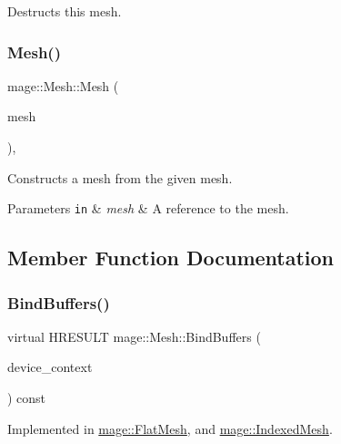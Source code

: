 Destructs this mesh. \hypertarget{classmage_1_1_mesh_a1627e85c72d10bdedbfbf746b108cc73}{}\label{classmage_1_1_mesh_a1627e85c72d10bdedbfbf746b108cc73} 
\subsubsection{\texorpdfstring{Mesh()}{Mesh()}\hspace{0.1cm}{\footnotesize\ttfamily [2/2]}}
{\footnotesize\ttfamily mage\+::\+Mesh\+::\+Mesh (\begin{DoxyParamCaption}\item[{const \hyperlink{classmage_1_1_mesh}{Mesh} \&}]{mesh }\end{DoxyParamCaption})\hspace{0.3cm}{\ttfamily [private]}, {\ttfamily [delete]}}

Constructs a mesh from the given mesh.


\begin{DoxyParams}[1]{Parameters}
\mbox{\tt in}  & {\em mesh} & A reference to the mesh. \\
\hline
\end{DoxyParams}


\subsection{Member Function Documentation}
\hypertarget{classmage_1_1_mesh_a0e558e82b0db25b0bbb4abeba9f0fb0f}{}\label{classmage_1_1_mesh_a0e558e82b0db25b0bbb4abeba9f0fb0f} 
\subsubsection{\texorpdfstring{Bind\+Buffers()}{BindBuffers()}}
{\footnotesize\ttfamily virtual H\+R\+E\+S\+U\+LT mage\+::\+Mesh\+::\+Bind\+Buffers (\begin{DoxyParamCaption}\item[{\hyperlink{namespacemage_ae74f374780900893caa5555d1031fd79}{Com\+Ptr}$<$ I\+D3\+D11\+Device\+Context2 $>$}]{device\+\_\+context }\end{DoxyParamCaption}) const\hspace{0.3cm}{\ttfamily [pure virtual]}}



Implemented in \hyperlink{classmage_1_1_flat_mesh_a3d7a8793a2b802aa51ae91517201af6d}{mage\+::\+Flat\+Mesh}, and \hyperlink{classmage_1_1_indexed_mesh_a4043a771a1ffe461cfd876dd62f68212}{mage\+::\+Indexed\+Mesh}.

